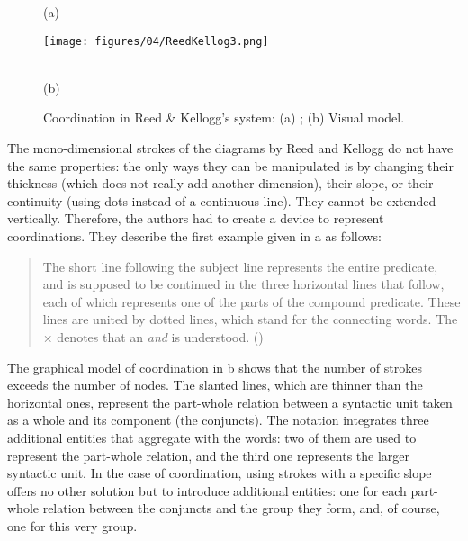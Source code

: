 \documentclass[english,output=paper,colorlinks,citecolor=brown]{../langscibook}
\begin{document}
\begin{figure}
    (a) \hspace{1em} \begin{minipage}[c]{.75\textwidth}\texttt{[image: figures/04/ReedKellog3.png]}\end{minipage}\bigskip\\
    (b) \hspace{1em} 
    \caption{Coordination in Reed \& Kellogg’s system: (a) \citeyear[47]{ReedBrainerd1879}; (b) Visual model.\label{fig:4:8}}    
\end{figure}


The mono-dimensional strokes of the diagrams by Reed and Kellogg do not have the same properties: the only ways they can be manipulated is by changing their thickness (which does not really add another dimension), their slope, or their continuity (using dots instead of a continuous line). They cannot be extended vertically. Therefore, the authors had to create a device to represent coordinations. They describe the first example given in a as follows:

\begin{quote}
The short line following the subject line represents the entire predicate, and is supposed to be continued in the three horizontal lines that follow, each of which represents one of the parts of the compound predicate. These lines are united by dotted lines, which stand for the connecting words. The × denotes that an \textit{and} is understood. (\citealt[47--48]{ReedBrainerd1879})
\end{quote}

The graphical model of coordination in b shows that the number of strokes exceeds the number of nodes. The slanted lines, which are thinner than the horizontal ones, represent the part-whole relation between a syntactic unit taken as a whole and its component (the conjuncts). The notation integrates three additional entities that aggregate with the words: two of them are used to represent the part-whole relation, and the third one represents the larger syntactic unit. In the case of coordination, using strokes with a specific slope offers no other solution but to introduce additional entities: one for each part-whole relation between the conjuncts and the group they form, and, of course, one for this very group.
\end{document}
